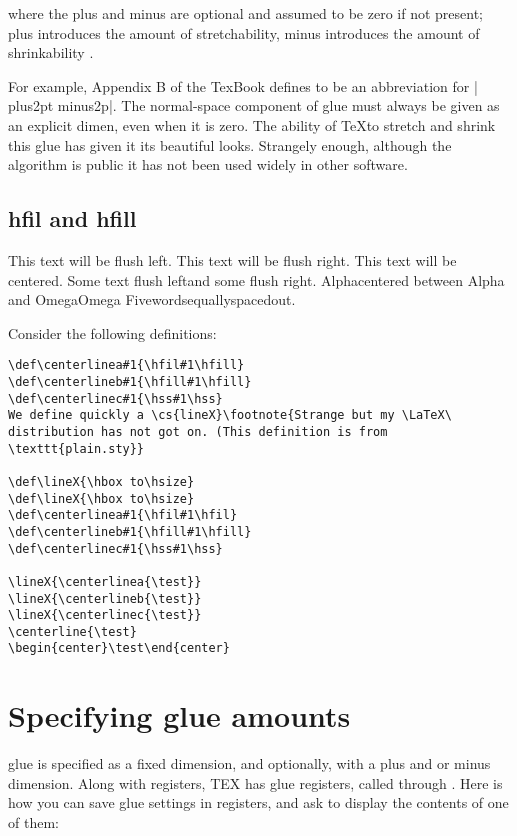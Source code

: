 where the plus and minus are optional and assumed to be zero if not
present; plus introduces the amount of stretchability, minus introduces the amount of shrinkability . 

For example, Appendix B of the TexBook defines  to be an abbreviation for
|\vskip6pt plus2pt minus2p|. The normal-space component of glue must always be
given as an explicit dimen, even when it is zero. The ability of \TeX to stretch and shrink this glue has given it its beautiful looks. Strangely enough, although the algorithm is public it has not been used widely in other software.



\subsection*{hfil and hfill}

{\obeylines
{This text will be flush left.\hfil}
{\hfil This text will be flush right.}
{\hfil This text will be centered.\hfil}
{Some text flush left\hfil and some flush right.}
{Alpha\hfil centered between Alpha and Omega\hfil Omega}
{Five\hfil words\hfil equally\hfil spaced\hfil out.}
}

Consider the following definitions:

\begin{verbatim}
\def\centerlinea#1{\hfil#1\hfill}
\def\centerlineb#1{\hfill#1\hfill}
\def\centerlinec#1{\hss#1\hss}
We define quickly a \cs{lineX}\footnote{Strange but my \LaTeX\ distribution has not got on. (This definition is from \texttt{plain.sty}}

\def\lineX{\hbox to\hsize}
\def\lineX{\hbox to\hsize}
\def\centerlinea#1{\hfil#1\hfil}
\def\centerlineb#1{\hfill#1\hfill}
\def\centerlinec#1{\hss#1\hss}

\lineX{\centerlinea{\test}}
\lineX{\centerlineb{\test}}
\lineX{\centerlinec{\test}}
\centerline{\test}
\begin{center}\test\end{center}

\end{verbatim}


\section{Specifying glue amounts}

\tex glue is specified as a fixed dimension, and optionally, with a plus and
or minus dimension. Along with  registers, TEX has glue registers,
called  through . Here is how you can save glue settings in
\tex registers, and ask \tex to display the contents of one of them:

